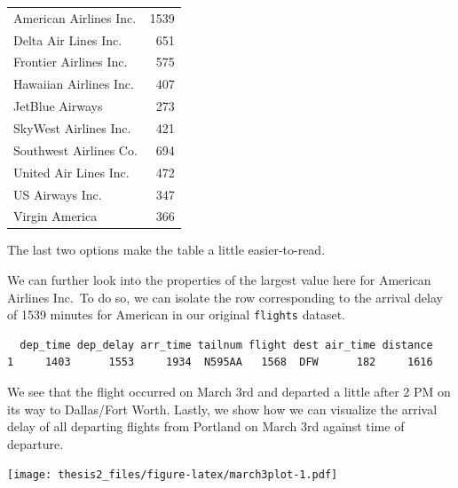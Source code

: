 \documentclass[twoside,12pt,final]{ucthesis-CA2012}
\newenvironment{Shaded}{}{}
\newcommand{\KeywordTok}[1]{\textcolor[rgb]{0.00,0.44,0.13}{\textbf{{#1}}}}
\newcommand{\DataTypeTok}[1]{\textcolor[rgb]{0.56,0.13,0.00}{{#1}}}
\newcommand{\DecValTok}[1]{\textcolor[rgb]{0.25,0.63,0.44}{{#1}}}
\newcommand{\StringTok}[1]{\textcolor[rgb]{0.25,0.44,0.63}{{#1}}}
\newcommand{\NormalTok}[1]{{#1}}
\newcommand{\OperatorTok}[1]{\textcolor[rgb]{0.00,0.44,0.13}{\textbf{{#1}}}}
\begin{document}
\begin{ucmainmatter}
\begin{longtable}[t]{lr}
American Airlines Inc. & 1539\\
Delta Air Lines Inc. & 651\\
Frontier Airlines Inc. & 575\\
Hawaiian Airlines Inc. & 407\\
\addlinespace
JetBlue Airways & 273\\
SkyWest Airlines Inc. & 421\\
Southwest Airlines Co. & 694\\
United Air Lines Inc. & 472\\
US Airways Inc. & 347\\
\addlinespace
Virgin America & 366\\
\bottomrule
\end{longtable}
The last two options make the table a little easier-to-read.

We can further look into the properties of the largest value here for American Airlines Inc.~To do so, we can isolate the row corresponding to the arrival delay of 1539 minutes for American in our original \texttt{flights} dataset.
\begin{Shaded}
\end{Shaded}
\begin{verbatim}
  dep_time dep_delay arr_time tailnum flight dest air_time distance
1     1403      1553     1934  N595AA   1568  DFW      182     1616
\end{verbatim}
We see that the flight occurred on March 3rd and departed a little after 2 PM on its way to Dallas/Fort Worth. Lastly, we show how we can visualize the arrival delay of all departing flights from Portland on March 3rd against time of departure.
\begin{Shaded}
\end{Shaded}
\texttt{[image: thesis2\_files/figure-latex/march3plot-1.pdf]}


\end{ucmainmatter}
\end{document}
